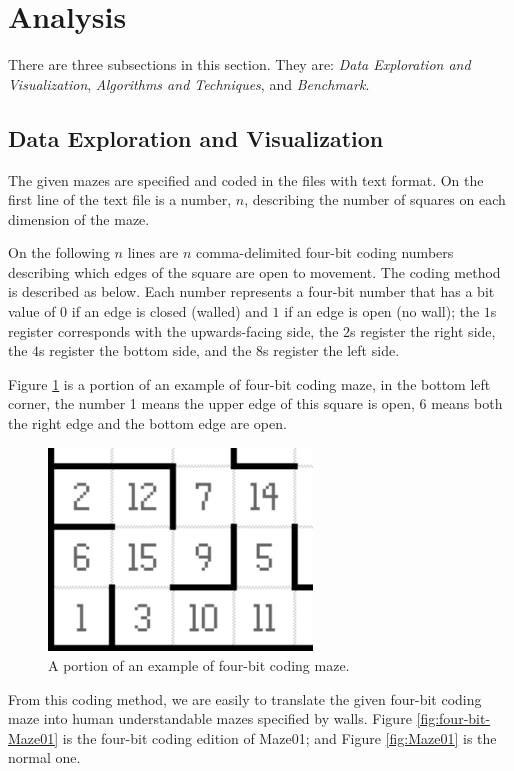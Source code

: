 \documentclass[11pt, oneside]{article}   	%
\begin{document}
\section{Analysis}
There are three subsections in this section. They are: {\it Data Exploration and Visualization}, {\it Algorithms and Techniques}, and {\it Benchmark}.
\subsection{Data Exploration and Visualization}
The given mazes are specified and coded in the files with text format. On the first line of the text file is a number, $n$, describing the number of squares on each dimension of the maze. 

On the following $n$ lines are $n$ comma-delimited four-bit coding numbers describing which edges of the square are open to movement. The coding method is described as below. Each number represents a four-bit number that has a bit value of $0$ if an edge is closed (walled) and $1$ if an edge is open (no wall); the $1$s register corresponds with the upwards-facing side, the $2$s register the right side, the $4$s register the bottom side, and the $8$s register the left side.

Figure {\ref {fig:example}} is a portion of an example of four-bit coding maze, in the bottom left corner, the number 1 means the upper edge of this square is open, 6 means both the right edge and the bottom edge are open.

\begin{figure}[htbp] %
   \centering
   \includegraphics[width=7cm]{example.png} 
   \caption{A portion of an example of four-bit coding maze.}
   \label{fig:example} 
\end{figure}

From this coding method, we are easily to translate the given four-bit coding maze into human understandable mazes specified by walls. Figure {\ref {fig:four-bit-Maze01}} is the four-bit coding edition of Maze01; and Figure {\ref {fig:Maze01}} is the normal one.
\end{document}
